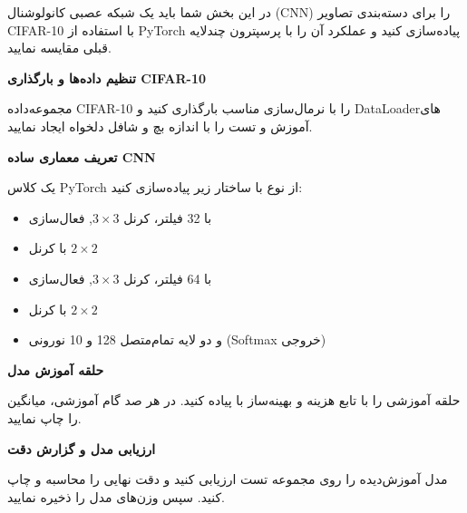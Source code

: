 \documentclass[12pt]{exam}
\begin{document}
	
	\vspace{1em}
	
	در این بخش شما باید یک شبکه عصبی کانولوشنال (CNN) را برای دسته‌بندی تصاویر CIFAR-10 با استفاده از PyTorch پیاده‌سازی کنید و عملکرد آن را با پرسپترون چندلایه قبلی مقایسه نمایید.
	
	\begin{questions}
		
		\question
		\textbf{تنظیم داده‌ها و بارگذاری CIFAR-10}
		
		مجموعه‌داده CIFAR-10 را با نرمال‌سازی مناسب بارگذاری کنید و DataLoader‌‌های آموزش و تست را با اندازه بچ و شافل دلخواه ایجاد نمایید.
		
		
		
		
		\question
		\textbf{تعریف معماری ساده CNN}
		
		یک کلاس PyTorch از نوع  با ساختار زیر پیاده‌سازی کنید:
		\begin{itemize}
			\item {} با 32 فیلتر، کرنل $3\times3$, فعال‌سازی 
			\item {} با کرنل $2\times2$
			\item {} با 64 فیلتر، کرنل $3\times3$, فعال‌سازی 
			\item {} با کرنل $2\times2$
			\item {} و دو لایه تمام‌متصل 128 و 10 نورونی (Softmax خروجی)
		\end{itemize}
		
		
		
		
		\question
		\textbf{حلقه آموزش مدل}
		
		حلقه آموزشی را با تابع هزینه  و بهینه‌ساز  با  پیاده کنید. در هر صد گام آموزشی، میانگین  را چاپ نمایید.
		
		
		
		
		\question
		\textbf{ارزیابی مدل و گزارش دقت}
		
		مدل آموزش‌دیده را روی مجموعه تست ارزیابی کنید و دقت نهایی را محاسبه و چاپ کنید. سپس وزن‌های مدل را ذخیره نمایید.
		
		
		

\end{questions}
\end{document}

